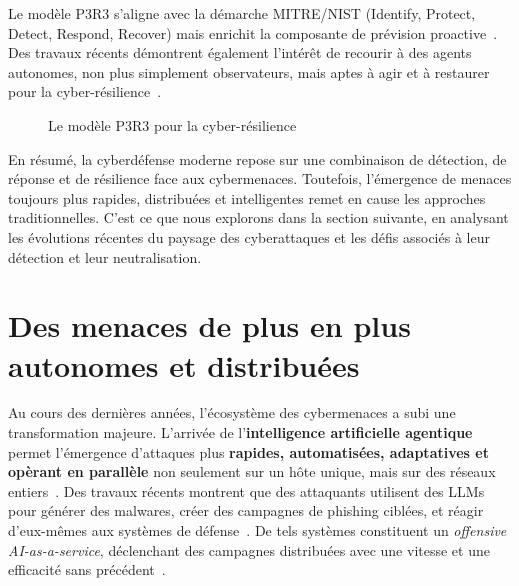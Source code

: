 \documentclass[ twoside,openright,titlepage,numbers=noenddot,headinclude,%
                footinclude=true,cleardoublepage=empty,abstractoff, %
                BCOR=5mm,paper=a4,fontsize=11pt,%
                french,american,%
                ]{scrreprt}
\begin{document}
Le modèle P3R3 s'aligne avec la démarche MITRE/NIST (Identify, Protect, Detect, Respond, Recover) mais enrichit la composante de prévision proactive~\cite{Theron2013P3R3}.
Des travaux récents démontrent également l'intérêt de recourir à des agents autonomes, non plus simplement observateurs, mais aptes à agir et à restaurer pour la cyber-résilience~\cite{Kott2023}.

\begin{figure}[h]
    \centering
    \caption{Le modèle P3R3 pour la cyber-résilience}
    \label{fig:P3R3_model}
\end{figure}

\noindent
En résumé, la cyberdéfense moderne repose sur une combinaison de détection, de réponse et de résilience face aux cybermenaces. Toutefois, l'émergence de menaces toujours plus rapides, distribuées et intelligentes remet en cause les approches traditionnelles. C'est ce que nous explorons dans la section suivante, en analysant les évolutions récentes du paysage des cyberattaques et les défis associés à leur détection et leur neutralisation.


\section{Des menaces de plus en plus autonomes et distribuées}\label{sec:evolution-menaces}


Au cours des dernières années, l'écosystème des cybermenaces a subi une transformation majeure. L'arrivée de l'\textbf{intelligence artificielle agentique} permet l'émergence d'attaques plus \textbf{rapides, automatisées, adaptatives et opèrant en parallèle} non seulement sur un hôte unique, mais sur des réseaux entiers~\cite{Cohen2020}. Des travaux récents montrent que des attaquants utilisent des LLMs pour générer des malwares, créer des campagnes de phishing ciblées, et réagir d'eux-mêmes aux systèmes de défense~\cite{AutoAttacker2024}. De tels systèmes constituent un {\em offensive AI-as-a-service}, déclenchant des campagnes distribuées avec une vitesse et une efficacité sans précédent~\cite{AgenticAIThreats2025}.
\end{document}
